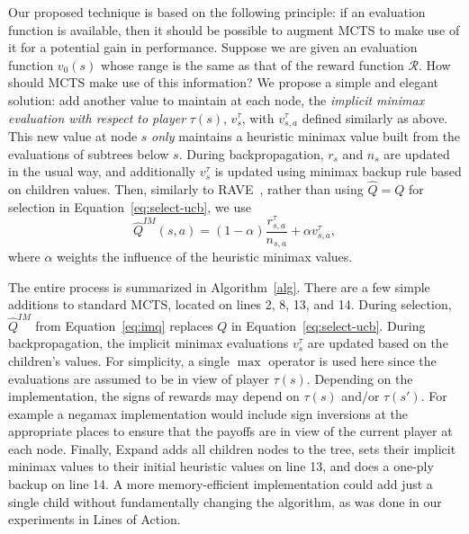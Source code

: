 \documentclass[conference]{IEEEtran}
\newcommand{\cR}{\mathcal{R}}
\newcommand{\hQ}{\hat{Q}}
\newcommand{\Expand}{{\sc Expand}}
\begin{document}
Our proposed technique is based on the following principle: if an evaluation function is available, then it should 
be possible to augment MCTS to make use of it for a potential gain in performance.  
Suppose we are given an evaluation function $v_0(s)$ whose range is the same as that of the reward function $\cR$. 
How should MCTS make use of this information? 
We propose a simple and elegant solution: add another value to maintain at each node, the 
{\it implicit minimax evaluation with respect to player} $\tau(s)$, $v^{\tau}_s$, with $v^{\tau}_{s,a}$ defined similarly 
as above. 
This new value at node $s$ {\it only} maintains a heuristic minimax value built from the evaluations of subtrees below $s$. 
During backpropagation, $r_s$ and $n_s$ are updated in the usual way, and additionally $v^{\tau}_s$ is updated using minimax backup 
rule based on children values. Then, similarly to RAVE~\cite{Gelly07Combining}, rather than using $\hQ = Q$ for 
selection in Equation~\ref{eq:select-ucb}, we use
\begin{equation}
\label{eq:imq}
\hQ^{\mathit{IM}}(s,a) = (1-\alpha) \frac{r^{\tau}_{s,a}}{n_{s,a}} + \alpha v^{\tau}_{s,a}, 
\end{equation}
where $\alpha$ weights the influence of the heuristic minimax values.

The entire process is summarized in Algorithm~\ref{alg}. There are a few simple additions to standard MCTS,
located on lines 2, 8, 13, and 14.
During selection, $\hQ^{\mathit{IM}}$ from Equation~\ref{eq:imq} replaces $Q$ in 
Equation~\ref{eq:select-ucb}. During backpropagation, the implicit minimax evaluations $v^{\tau}_s$ are updated based on 
the children's values. For simplicity, a single $\max$ operator is used here since the evaluations are assumed to be in 
view of player $\tau(s)$. 
Depending on the implementation, the signs of rewards may depend on $\tau(s)$ and/or $\tau(s')$.
For example a negamax implementation would include sign inversions at the appropriate places 
to ensure that the payoffs are in view of the current player at each node.  
Finally, \Expand\xspace adds all children nodes to the tree, sets their implicit minimax values to their initial
heuristic values on line 13, and does a one-ply backup on line 14. 
A more memory-efficient implementation could add just a single child without fundamentally changing
the algorithm, as was done in our experiments in Lines of Action.
\end{document}
